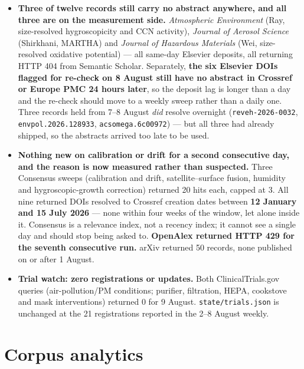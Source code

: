 \documentclass[10pt]{article}
\begin{document}
\begin{itemize}
\item \textbf{Three of twelve records still carry no abstract anywhere, and all three are
on the measurement side.} \textit{Atmospheric Environment} (Ray, size-resolved
hygroscopicity and CCN activity), \textit{Journal of Aerosol Science} (Shirkhani, MARTHA)
and \textit{Journal of Hazardous Materials} (Wei, size-resolved oxidative potential) ---
all same-day Elsevier deposits, all returning HTTP 404 from Semantic Scholar. Separately,
\textbf{the six Elsevier DOIs flagged for re-check on 8 August still have no abstract in
Crossref or Europe PMC 24 hours later}, so the deposit lag is longer than a day and the
re-check should move to a weekly sweep rather than a daily one. Three records held from
7--8 August \emph{did} resolve overnight (\texttt{reveh-2026-0032},
\texttt{envpol.2026.128933}, \texttt{acsomega.6c00972}) --- but all three had already
shipped, so the abstracts arrived too late to be used.

\item \textbf{Nothing new on calibration or drift for a second consecutive day, and the
reason is now measured rather than suspected.} Three Consensus sweeps (calibration and
drift, satellite--surface fusion, humidity and hygroscopic-growth correction) returned
20 hits each, capped at 3. All nine returned DOIs resolved to Crossref creation dates
between \textbf{12 January and 15 July 2026} --- none within four weeks of the window,
let alone inside it. Consensus is a relevance index, not a recency index; it cannot see
a single day and should stop being asked to. \textbf{OpenAlex returned HTTP 429 for the
seventh consecutive run.} arXiv returned 50 records, none published on or after 1 August.

\item \textbf{Trial watch: zero registrations or updates.} Both ClinicalTrials.gov
queries (air-pollution/PM conditions; purifier, filtration, HEPA, cookstove and mask
interventions) returned 0 for 9 August. \texttt{state/trials.json} is unchanged at the
21 registrations reported in the 2--8 August weekly.
\end{itemize}

\clearpage

\section*{\sffamily\bfseries\color{Deep}Corpus analytics}
\vspace{-1.5mm}{\color{Amber}\rule{\linewidth}{1.1pt}}\vspace{3mm}
\end{document}
